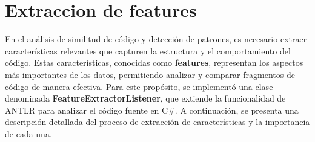 \section{Extraccion de features}

En el análisis de similitud de código y detección de patrones, es necesario extraer características relevantes que capturen la estructura y el comportamiento del código. Estas características, conocidas como {\bf features}, representan los aspectos más importantes de los datos, permitiendo analizar y comparar fragmentos de código de manera efectiva. Para este propósito, se implementó una clase denominada {\bf FeatureExtractorListener}, que extiende la funcionalidad de ANTLR para analizar el código fuente en C\#. A continuación, se presenta una descripción detallada del proceso de extracción de características y la importancia de cada una. \\

